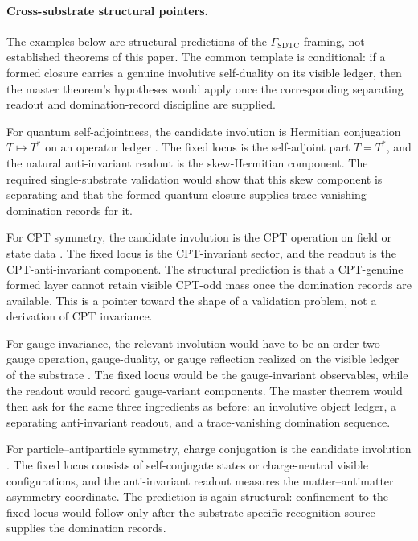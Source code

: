 \documentclass[11pt]{article}
\newcommand{\GamSDTC}{\Gamma_{\mathrm{SDTC}}}
\theoremstyle{definition}
\begin{document}
\paragraph{Cross-substrate structural pointers.}
The examples below are structural predictions of the
\(\GamSDTC\) framing, not established theorems of this paper.  The
common template is conditional: if a formed closure carries a
genuine involutive self-duality on its visible ledger, then the
master theorem's hypotheses would apply once the corresponding
separating readout and domination-record discipline are supplied.

For quantum self-adjointness, the candidate involution is Hermitian
conjugation \(T\mapsto T^*\) on an operator ledger
\citep{ReedSimon1975,Hall2013}.  The fixed locus is the self-adjoint
part \(T=T^*\), and the natural anti-invariant readout is the
skew-Hermitian component.  The required single-substrate validation
would show that this skew component is separating and that the
formed quantum closure supplies trace-vanishing domination records
for it.

For CPT symmetry, the candidate involution is the CPT operation on
field or state data \citep{StreaterWightman2000,Weinberg1995}.  The
fixed locus is the CPT-invariant sector, and the readout is the
CPT-anti-invariant component.  The structural prediction is that a
CPT-genuine formed layer cannot retain visible CPT-odd mass once
the domination records are available.  This is a pointer toward the
shape of a validation problem, not a derivation of CPT invariance.

For gauge invariance, the relevant involution would have to be an
order-two gauge operation, gauge-duality, or gauge reflection
realized on the visible ledger of the substrate
\citep{PeskinSchroeder1995,Bleecker1981}.  The fixed locus would be
the gauge-invariant observables, while the readout would record
gauge-variant components.  The master theorem would then ask for
the same three ingredients as before: an involutive object ledger,
a separating anti-invariant readout, and a trace-vanishing
domination sequence.

For particle--antiparticle symmetry, charge conjugation is the
candidate involution \citep{PeskinSchroeder1995,Weinberg1995}.  The
fixed locus consists of self-conjugate states or charge-neutral
visible configurations, and the anti-invariant readout measures the
matter--antimatter asymmetry coordinate.  The prediction is again
structural: confinement to the fixed locus would follow only after
the substrate-specific recognition source supplies the domination
records.
\end{document}
